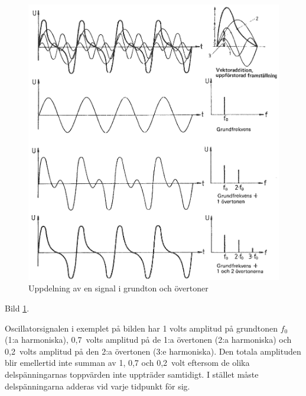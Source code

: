 \begin{figure}
\begin{center}
\includegraphics[width=\textwidth]{images/cropped_pdfs/bild_2_1-19.pdf}
\caption{Uppdelning av en signal i grundton och övertoner}
\label{fig:BildII1-19}
\end{center}
\end{figure}

Bild \ref{fig:BildII1-19}.

Oscillatorsignalen i exemplet på bilden har 1 volts amplitud på grundtonen
\(f_0\) (1:a harmoniska), 0,7~volts amplitud på de 1:a övertonen
(2:a harmoniska) och 0,2~volts amplitud på den 2:a övertonen (3:e harmoniska).
Den totala amplituden blir emellertid inte summan av 1, 0,7 och 0,2~volt
eftersom de olika delspänningarnas toppvärden inte uppträder samtidigt.
I stället måste delspänningarna adderas vid varje tidpunkt för sig.

